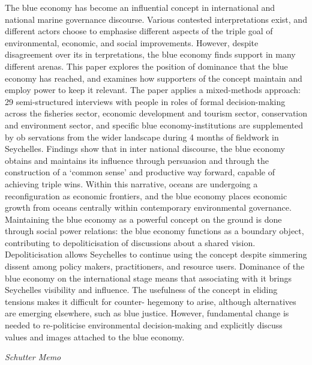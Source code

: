\documentclass[
]{book}
\begin{document}
The blue economy has become an influential concept in international and national marine governance discourse.
Various contested interpretations exist, and different actors choose to emphasise different aspects of the triple
goal of environmental, economic, and social improvements. However, despite disagreement over its in­
terpretations, the blue economy finds support in many different arenas. This paper explores the position of
dominance that the blue economy has reached, and examines how supporters of the concept maintain and
employ power to keep it relevant. The paper applies a mixed-methods approach: 29 semi-structured interviews
with people in roles of formal decision-making across the fisheries sector, economic development and tourism
sector, conservation and environment sector, and specific blue economy-institutions are supplemented by ob­
servations from the wider landscape during 4 months of fieldwork in Seychelles. Findings show that in inter­
national discourse, the blue economy obtains and maintains its influence through persuasion and through the
construction of a `common sense' and productive way forward, capable of achieving triple wins. Within this
narrative, oceans are undergoing a reconfiguration as economic frontiers, and the blue economy places economic
growth from oceans centrally within contemporary environmental governance. Maintaining the blue economy as
a powerful concept on the ground is done through social power relations: the blue economy functions as a
boundary object, contributing to depoliticisation of discussions about a shared vision. Depoliticisation allows
Seychelles to continue using the concept despite simmering dissent among policy makers, practitioners, and
resource users. Dominance of the blue economy on the international stage means that associating with it brings
Seychelles visibility and influence. The usefulness of the concept in eliding tensions makes it difficult for counter-
hegemony to arise, although alternatives are emerging elsewhere, such as blue justice. However, fundamental
change is needed to re-politicise environmental decision-making and explicitly discuss values and images
attached to the blue economy.

\emph{Schutter Memo}
\end{document}
